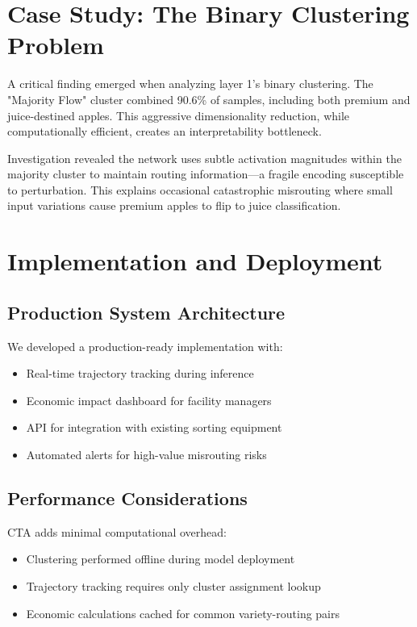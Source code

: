\documentclass[11pt,a4paper]{article}
\begin{document}
\section{Case Study: The Binary Clustering Problem}

A critical finding emerged when analyzing layer 1's binary clustering. The "Majority Flow" cluster combined 90.6\% of samples, including both premium and juice-destined apples. This aggressive dimensionality reduction, while computationally efficient, creates an interpretability bottleneck.

Investigation revealed the network uses subtle activation magnitudes within the majority cluster to maintain routing information—a fragile encoding susceptible to perturbation. This explains occasional catastrophic misrouting where small input variations cause premium apples to flip to juice classification.

\section{Implementation and Deployment}

\subsection{Production System Architecture}

We developed a production-ready implementation with:
\begin{itemize}
    \item Real-time trajectory tracking during inference
    \item Economic impact dashboard for facility managers
    \item API for integration with existing sorting equipment
    \item Automated alerts for high-value misrouting risks
\end{itemize}

\subsection{Performance Considerations}

CTA adds minimal computational overhead:
\begin{itemize}
    \item Clustering performed offline during model deployment
    \item Trajectory tracking requires only cluster assignment lookup
    \item Economic calculations cached for common variety-routing pairs
\end{itemize}
\end{document}
